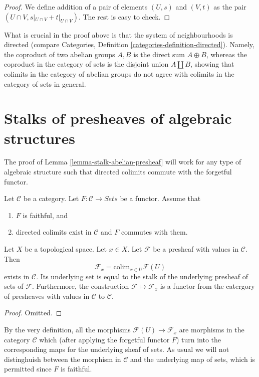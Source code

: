 \begin{proof}
We define addition of a pair of elements
$(U, s)$ and $(V, t)$ as the pair $(U \cap V, s|_{U\cap V} +
t|_{U \cap V})$. The rest is easy to check.
\end{proof}

\noindent
What is crucial in the proof above is that the system of
neighbourhoods is directed (compare Categories, Definition
\ref{categories-definition-directed}). Namely, the coproduct
of two abelian groups $A, B$ is the direct sum $A \oplus B$, whereas
the coproduct in the category of sets is the disjoint
union $A \coprod B$, showing that colimits in the category
of abelian groups do not agree with colimits in the
category of sets in general.


\section{Stalks of presheaves of algebraic structures}
\label{stalks-presheaves-structures}

\noindent
The proof of Lemma \ref{lemma-stalk-abelian-presheaf} will work
for any type of algebraic structure such that directed
colimits commute with the forgetful functor.

\begin{lemma}
\label{lemma-stalk-presheaf-values-in-category}
Let $\mathcal{C}$ be a category. Let $F : \mathcal{C} \to \textit{Sets}$
be a functor. Assume that
\begin{enumerate}
\item $F$ is faithful, and
\item directed colimits exist in $\mathcal{C}$ and $F$ commutes with
them.
\end{enumerate}
Let $X$ be a topological space. Let $x \in X$. Let $\mathcal{F}$
be a presheaf with values in $\mathcal{C}$.
Then
$$
\mathcal{F}_x = \text{colim}_{x\in U} \mathcal{F}(U)
$$
exists in $\mathcal{C}$. Its underlying set is equal to the
stalk of the underlying presheaf of sets of $\mathcal{F}$.
Furthermore, the construction $\mathcal{F} \mapsto \mathcal{F}_x$
is a functor from the catergory of presheaves with values in
$\mathcal{C}$ to $\mathcal{C}$.
\end{lemma}

\begin{proof}
Omitted.
\end{proof}

\noindent
By the very definition, all the morphisms $\mathcal{F}(U)
\to \mathcal{F}_x$ are morphisms in the category $\mathcal{C}$
which (after applying the forgetful functor $F$) turn into
the corresponding maps for the underlying sheaf of sets.
As usual we will not distinghuish between the morphism
in $\mathcal{C}$ and the underlying map of sets, which
is permitted since $F$ is faithful.

